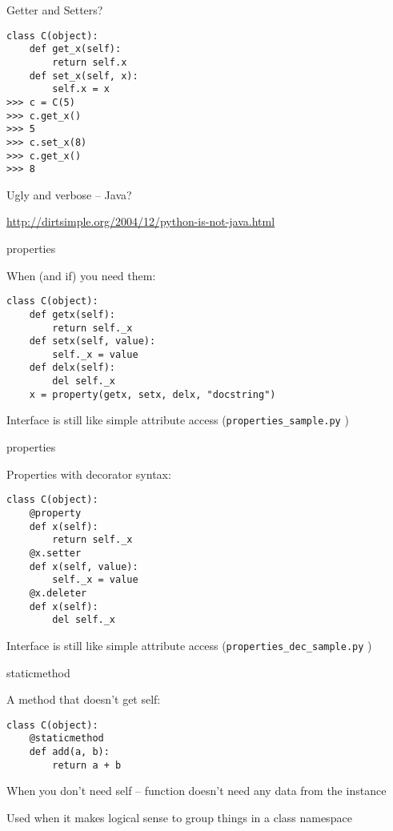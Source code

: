 \documentclass{beamer}
\begin{document}
\begin{frame}[fragile]{Getter and Setters?}
\begin{verbatim}
class C(object):
    def get_x(self):
        return self.x
    def set_x(self, x):
        self.x = x
>>> c = C(5)
>>> c.get_x()
>>> 5
>>> c.set_x(8)
>>> c.get_x()
>>> 8
\end{verbatim}
{\Large Ugly and verbose -- Java?}

\url{http://dirtsimple.org/2004/12/python-is-not-java.html}

\end{frame} 

\begin{frame}[fragile]{properties}

{ \Large When (and if) you need them: }

\begin{verbatim}
class C(object):
    def getx(self):
        return self._x
    def setx(self, value):
        self._x = value
    def delx(self):
        del self._x
    x = property(getx, setx, delx, "docstring")
\end{verbatim}
{\Large Interface is still like simple attribute access}
(\verb|properties_sample.py| )
\end{frame} 

\begin{frame}[fragile]{properties}

{ \Large Properties with decorator syntax: }

\begin{verbatim}
class C(object):
    @property
    def x(self):
        return self._x
    @x.setter
    def x(self, value):
        self._x = value
    @x.deleter    
    def x(self):
        del self._x
\end{verbatim}
{\Large Interface is still like simple attribute access}
(\verb|properties_dec_sample.py| )
\end{frame} 



\begin{frame}[fragile]{staticmethod}

{ \Large A method that doesn't get self: }

\begin{verbatim}
class C(object):
    @staticmethod
    def add(a, b):
        return a + b
\end{verbatim}

\vfill
{\Large When you don't need self -- function doesn't need any data from the instance}

\vfill
{\Large Used when it makes logical sense to group things in a class namespace}

\end{frame} 
\end{document}
